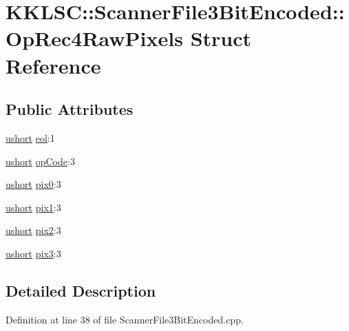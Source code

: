 \hypertarget{struct_scanner_file3_bit_encoded_1_1_op_rec4_raw_pixels}{}\section{K\+K\+L\+SC\+:\+:Scanner\+File3\+Bit\+Encoded\+:\+:Op\+Rec4\+Raw\+Pixels Struct Reference}
\label{struct_scanner_file3_bit_encoded_1_1_op_rec4_raw_pixels}
\subsection*{Public Attributes}
\begin{DoxyCompactItemize}
\item 
\hyperlink{namespace_k_k_b_a4a7e2d1bab49f38edf25c38a8dc20012}{ushort} \hyperlink{struct_scanner_file3_bit_encoded_1_1_op_rec4_raw_pixels_a3136b43f00adeac5752526ef860aed49}{eol}\+:1
\item 
\hyperlink{namespace_k_k_b_a4a7e2d1bab49f38edf25c38a8dc20012}{ushort} \hyperlink{struct_scanner_file3_bit_encoded_1_1_op_rec4_raw_pixels_a045c32dd22bf6c13ea278ef7bd09babe}{op\+Code}\+:3
\item 
\hyperlink{namespace_k_k_b_a4a7e2d1bab49f38edf25c38a8dc20012}{ushort} \hyperlink{struct_scanner_file3_bit_encoded_1_1_op_rec4_raw_pixels_a489d0fe4904e06dff298e7629bb8429a}{pix0}\+:3
\item 
\hyperlink{namespace_k_k_b_a4a7e2d1bab49f38edf25c38a8dc20012}{ushort} \hyperlink{struct_scanner_file3_bit_encoded_1_1_op_rec4_raw_pixels_aa38b3af2bb49373baa63cc8c232bd5e7}{pix1}\+:3
\item 
\hyperlink{namespace_k_k_b_a4a7e2d1bab49f38edf25c38a8dc20012}{ushort} \hyperlink{struct_scanner_file3_bit_encoded_1_1_op_rec4_raw_pixels_a1b012bd865aa55b188f411ab134e7cc6}{pix2}\+:3
\item 
\hyperlink{namespace_k_k_b_a4a7e2d1bab49f38edf25c38a8dc20012}{ushort} \hyperlink{struct_scanner_file3_bit_encoded_1_1_op_rec4_raw_pixels_a522755d99e7d23510ab674d3c495eb1a}{pix3}\+:3
\end{DoxyCompactItemize}


\subsection{Detailed Description}


Definition at line 38 of file Scanner\+File3\+Bit\+Encoded.\+cpp.



